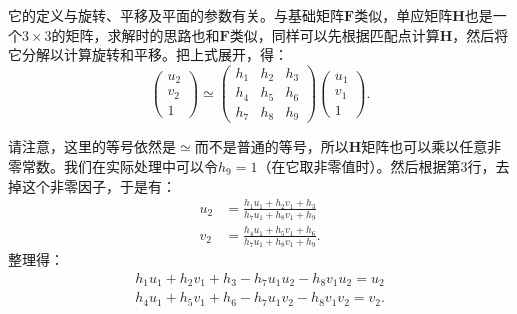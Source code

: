 它的定义与旋转、平移及平面的参数有关。与基础矩阵$\bm{F}$类似，单应矩阵$\bm{H}$也是一个$3 \times 3$的矩阵，求解时的思路也和$\bm{F}$类似，同样可以先根据匹配点计算$\bm{H}$，然后将它分解以计算旋转和平移。把上式展开，得：
\begin{equation}
\begin{pmatrix} 
u_{2}\\v_{2}\\1
\end{pmatrix}
\simeq
\begin{pmatrix}
 h_{1} & h_{2} & h_{3}\\ 
 h_{4} & h_{5} & h_{6}\\ 
 h_{7} & h_{8} & h_{9} 
\end{pmatrix}
\begin{pmatrix} 
u_{1}\\v_{1}\\1
\end{pmatrix}.
\end{equation}

请注意，这里的等号依然是$\simeq$而不是普通的等号，所以$\bm{H}$矩阵也可以乘以任意非零常数。我们在实际处理中可以令$h_9 = 1$（在它取非零值时）。然后根据第3行，去掉这个非零因子，于是有：
\[
\begin{aligned}
u_{2}&=\frac{h_{1}u_{1}+h_{2}v_{1}+h_{3}}{h_{7}u_{1}+h_{8}v_{1}+h_{9}}\\
v_{2}&=\frac{h_{4}u_{1}+h_{5}v_{1}+h_{6}}{h_{7}u_{1}+h_{8}v_{1}+h_{9}}.
\end{aligned}
\]
整理得：
\[
\begin{gathered}
h_{1}u_{1}+h_{2}v_{1}+h_{3}-h_{7}u_{1}u_{2}-h_{8}v_{1}u_{2}=u_{2}\\
h_{4}u_{1}+h_{5}v_{1}+h_{6}-h_{7}u_{1}v_{2}-h_{8}v_{1}v_{2}=v_{2}.
\end{gathered}
\]

